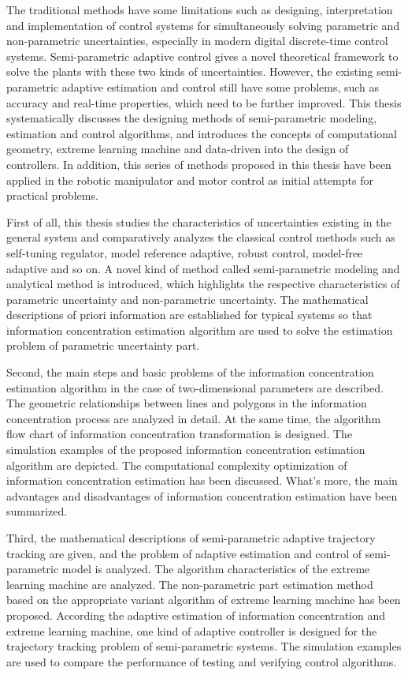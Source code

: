 \begin{englishabstract}

The traditional methods have some limitations such as designing, interpretation and implementation of control  systems for simultaneously solving parametric and non-parametric uncertainties, especially in modern digital discrete-time control systems. Semi-parametric adaptive control gives a novel theoretical framework to solve the plants with these two kinds of uncertainties. However, the existing semi-parametric adaptive estimation and control still have some problems, such as accuracy and real-time properties, which need to be further improved. This thesis systematically discusses the designing methods of semi-parametric modeling, estimation and control algorithms, and introduces the concepts of computational geometry, extreme learning machine and data-driven into the design of controllers. In addition, this series of methods proposed in this thesis have been applied in the robotic manipulator and motor control as initial attempts for practical problems. 

First of all, this thesis studies the characteristics of uncertainties existing in the general system and comparatively analyzes the classical control methods such as self-tuning regulator, model reference adaptive, robust control, model-free adaptive and so on. A novel kind of method called semi-parametric modeling and analytical method is introduced, which highlights the respective characteristics of parametric uncertainty and non-parametric uncertainty. The mathematical descriptions of priori information are established for typical systems so that information concentration estimation algorithm are used to solve the estimation problem of parametric uncertainty part.

Second, the main steps and basic problems of the information concentration estimation algorithm in the case of two-dimensional parameters are described. The geometric relationships between lines and polygons in the information concentration process are analyzed in detail. At the same time, the algorithm flow chart of information concentration transformation is designed. The simulation examples of the proposed information concentration estimation algorithm are depicted. The computational complexity optimization of information concentration estimation has been discussed. What's more, the main advantages and disadvantages of information concentration estimation have been summarized.

Third, the mathematical descriptions of semi-parametric adaptive trajectory tracking are given, and the problem of adaptive estimation and control of semi-parametric model is analyzed. The algorithm characteristics of the extreme learning machine are analyzed. The non-parametric part estimation method based on the appropriate variant algorithm of extreme learning machine has been proposed. According the adaptive estimation of information concentration and extreme learning machine, one kind of adaptive controller is designed for the trajectory tracking problem of semi-parametric systems. The simulation examples are used to compare the performance of testing and verifying control algorithms.


\end{englishabstract}
